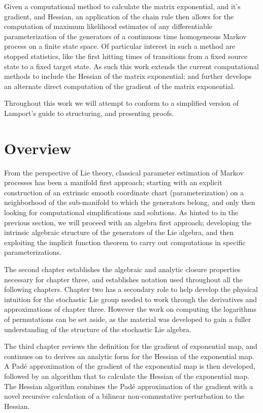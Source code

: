 Given a computational method to calculate the matrix exponential, and it's gradient, and
Hessian, an application of the chain rule then allows for the computation of maximum
likelihood estimates of any differentiable parameterization of the generators of a
continuous time homogeneous Markov process on a finite state space. Of particular interest
in such a method are stopped statistics, like the first hitting times of transitions from a
fixed source state to a fixed target state. As such this work extends the current
computational methods to include the Hessian of the matrix exponential; and further develops
an alternate direct computation of the gradient of the matrix exponential.

Throughout this work we will attempt to conform to a simplified version of Lamport's guide
to structuring, and presenting proofs\cite{lamport_how_2012}.
\section{Overview}
From the perspective of Lie theory, classical parameter estimation of Markov processes has
been a manifold first approach; starting with an explicit construction of an extrinsic
smooth coordinate chart (parameterization) on a neighborhood of the sub-manifold to which
the generators belong, and only then looking for computational simplifications and
solutions. As hinted to in the previous section, we will proceed with an algebra first
approach; developing the intrinsic algebraic structure of the generators of the Lie algebra,
and then exploiting the implicit function theorem to carry out computations in specific 
parameterizations.

The second chapter establishes the algebraic and analytic closure properties necessary for 
chapter three, and establishes notation used throughout all the following chapters. Chapter
two has a secondary role to help develop the physical intuition for the stochastic Lie group
needed to work through the derivatives and approximations of chapter three. However the work
on computing the logarithms of permutations can be set aside, as the material was developed
to gain a fuller understanding of the structure of the stochastic Lie algebra.

The third chapter reviews the definition for the gradient of exponential map, and  continues
on to derives an analytic form for the Hessian of the exponential map. A Pad\'{e}
approximation of the gradient of the exponential map is then developed, followed by an
algorithm that to calculate the Hessian of the exponential map. The Hessian algorithm 
combines the Pad\'{e} approximation of the gradient with a novel recursive calculation of a
bilinear non-commutative perturbation to the Hessian.


